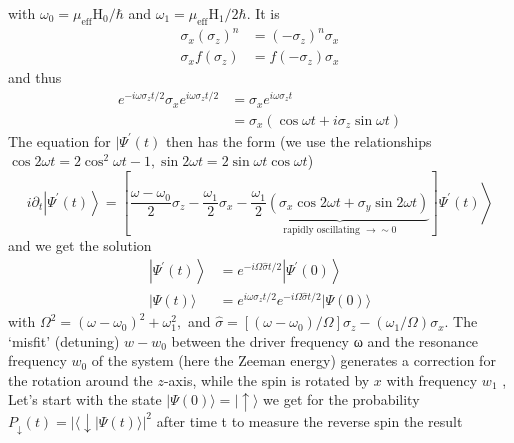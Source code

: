 with $\omega_{0}=\mu_{\mathrm{eff}} \mathrm{H}_{0} / \hbar$ and $\omega_{1}=\mu_{\mathrm{eff}} \mathrm{H}_{1} / 2 \hbar$. It is
\begin{equation}
\begin{aligned} \sigma_{x}\left(\sigma_{z}\right)^{n} &=\left(-\sigma_{z}\right)^{n} \sigma_{x} \\ \sigma_{x} f\left(\sigma_{z}\right) &=f\left(-\sigma_{z}\right) \sigma_{x} \end{aligned}
\end{equation}
and thus
\begin{equation}
\begin{aligned} e^{-i \omega \sigma_{z} t / 2} \sigma_{x} e^{i \omega \sigma_{z} t / 2} &=\sigma_{x} e^{i \omega \sigma_{z} t} \\ &=\sigma_{x}\left(\cos \omega t+i \sigma_{z} \sin \omega t\right) \end{aligned}
\end{equation}
The equation for $|\Psi^{\prime}(t)$ then has the form (we use the relationships $\cos 2 \omega t=2 \cos ^{2} \omega t-1, \sin 2 \omega t=2 \sin \omega t \cos \omega t$) 
\begin{equation}
    \left.i \partial_{t}\left|\Psi^{\prime}(t)\right\rangle=\left[\frac{\omega-\omega_{0}}{2} \sigma_{z}-\frac{\omega_{1}}{2} \sigma_{x}-\underbrace{\frac{\omega_{1}}{2}\left(\sigma_{x} \cos 2 \omega t+\sigma_{y} \sin 2 \omega t\right)}_{\text {rapidly oscillating } \rightarrow \sim 0}\right] \Psi^{\prime}(t)\right\rangle \nonumber
    \end{equation}
and we get the solution
\begin{equation}
\begin{aligned}\left|\Psi^{\prime}(t)\right\rangle &= e^{-i \Omega \hat{\sigma} t / 2}\left|\Psi^{\prime}(0)\right\rangle \\|\Psi(t)\rangle &= e^{i \omega \sigma_{z} t / 2} e^{-i \Omega \hat{\sigma} t / 2}|\Psi(0)\rangle \end{aligned}
\end{equation}
with $\Omega^{2}=\left(\omega-\omega_{0}\right)^{2}+\omega_{1}^{2},$ and $\hat{\sigma}=\left[\left(\omega-\omega_{0}\right) / \Omega\right] \sigma_{z}-\left(\omega_{1} / \Omega\right) \sigma_{x}$. The `misfit' (detuning) $w-w_0$ between the driver frequency ω and the resonance frequency $w_0$ of the system (here the Zeeman energy) generates a correction for the rotation around the $z$-axis, while the spin is rotated by $x$ with frequency $w_1$ , Let's start with the state $|\Psi(0)\rangle=|\uparrow\rangle$ we get for the probability $P_{\downarrow}(t)=|\langle\downarrow | \Psi(t)\rangle|^{2}$ after time t to measure the reverse spin the result
